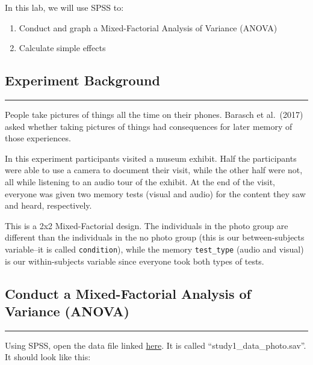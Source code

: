 \documentclass[
]{book}
\providecommand{\tightlist}{%
  \setlength{\itemsep}{0pt}\setlength{\parskip}{0pt}}
\begin{document}
In this lab, we will use SPSS to:

\begin{enumerate}
\def\labelenumi{\arabic{enumi}.}
\tightlist
\item
  Conduct and graph a Mixed-Factorial Analysis of Variance (ANOVA)
\item
  Calculate simple effects
\end{enumerate}

\hypertarget{experiment-background-10}{%
\subsection{Experiment Background}\label{experiment-background-10}}

\begin{center}\rule{0.5\linewidth}{0.5pt}\end{center}

People take pictures of things all the time on their phones. Barasch et al.~(2017) asked whether taking pictures of things had consequences for later memory of those experiences.

In this experiment participants visited a museum exhibit. Half the participants were able to use a camera to document their visit, while the other half were not, all while listening to an audio tour of the exhibit. At the end of the visit, everyone was given two memory tests (visual and audio) for the content they saw and heard, respectively.

This is a 2x2 Mixed-Factorial design. The individuals in the photo group are different than the individuals in the no photo group (this is our between-subjects variable--it is called \texttt{condition}), while the memory \texttt{test\_type} (audio and visual) is our within-subjects variable since everyone took both types of tests.

\hypertarget{conduct-a-mixed-factorial-analysis-of-variance-anova}{%
\subsection{Conduct a Mixed-Factorial Analysis of Variance (ANOVA)}\label{conduct-a-mixed-factorial-analysis-of-variance-anova}}

\begin{center}\rule{0.5\linewidth}{0.5pt}\end{center}

Using SPSS, open the data file linked \href{https://github.com/CrumpLab/statisticsLab/blob/master/data/spssdata/study1_data_photo.sav}{here}. It is called ``study1\_data\_photo.sav''. It should look like this:
\end{document}
